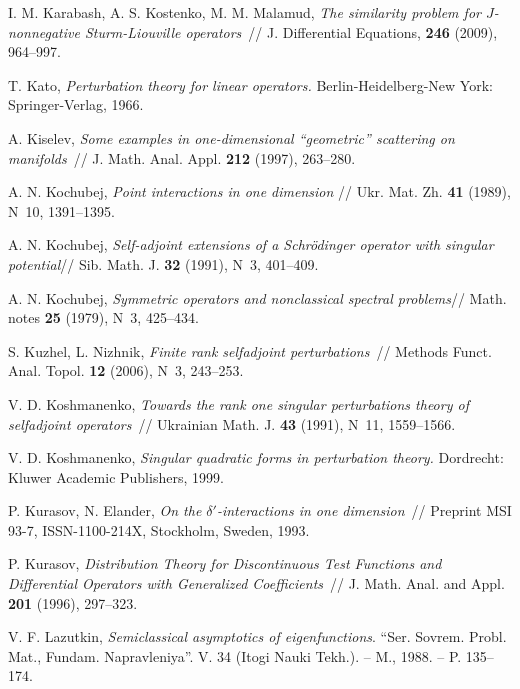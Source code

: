\documentclass[11pt,english]{amsart}%
\begin{document}
\begin{thebibliography}{99}
I. M. Karabash, A. S. Kostenko, M. M. Malamud, \textit{The similarity problem for
$J$-nonnegative Sturm-Liouville operators}~// J. Differential Equations, \textbf{246}
(2009), 964--997.


T. Kato, \textit{Perturbation theory for linear operators.} Berlin-Heidelberg-New York: Springer-Verlag, 1966.


A. Kiselev, \textit{Some examples in one-dimensional ``geometric'' scattering on
manifolds}~// J. Math. Anal. Appl. \textbf{212} (1997), 263--280.




A. N. Kochubej, \textit{Point interactions in one dimension} // Ukr. Mat. Zh.  \textbf{41} (1989), N~10,
1391--1395.

A. N. Kochubej, \textit{Self-adjoint extensions of a Schr\"odinger operator with singular potential}// Sib. Math. J. \textbf{32} (1991), N~3, 401--409.



A. N. Kochubej, \textit{Symmetric operators and nonclassical spectral problems}// Math. notes \textbf{25} (1979),
N~3, 425--434.


S. Kuzhel, L. Nizhnik, \textit{Finite rank selfadjoint perturbations}~// Methods Funct.
Anal. Topol. \textbf{12} (2006), N~3, 243--253.

 V. D. Koshmanenko, \textit{Towards the rank one
singular perturbations theory of selfadjoint operators}~// Ukrainian Math. J. \textbf{43}
(1991), N~11, 1559--1566.

V. D. Koshmanenko, \textit{Singular quadratic forms in perturbation theory.} Dordrecht: Kluwer
    Academic Publishers, 1999.


 P. Kurasov,  N. Elander, \textit{On the $\delta'$-interactions in one dimension}~//
Preprint MSI 93-7, ISSN-1100-214X, Stockholm, Sweden, 1993.

 P. Kurasov, \textit{Distribution Theory for Discontinuous Test
Functions and Differential Operators with Generalized Coefficients}~// J. Math. Anal. and
Appl. \textbf{201} (1996), 297--323.

V. F. Lazutkin, {\it Semiclassical asymptotics of eigenfunctions}.
 ``Ser. Sovrem. Probl. Mat., Fundam. Napravleniya''. V. 34 (Itogi Nauki Tekh.). -- M., 1988. -- P. 135--174.



\end{thebibliography}
\end{document}
